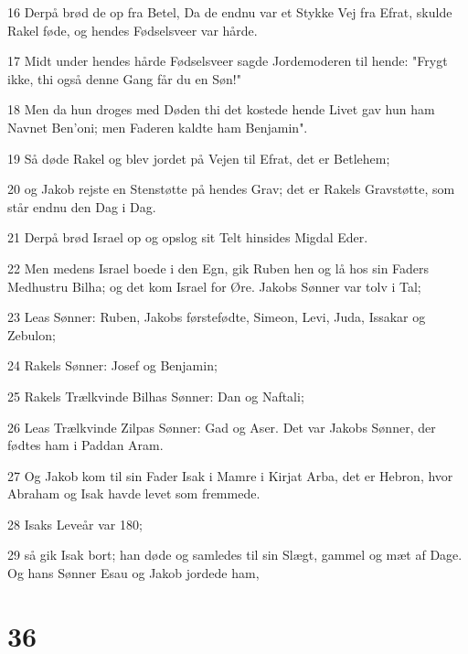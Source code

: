 \par 16 Derpå brød de op fra Betel, Da de endnu var et Stykke Vej fra Efrat, skulde Rakel føde, og hendes Fødselsveer var hårde.
\par 17 Midt under hendes hårde Fødselsveer sagde Jordemoderen til hende: "Frygt ikke, thi også denne Gang får du en Søn!"
\par 18 Men da hun droges med Døden thi det kostede hende Livet gav hun ham Navnet Ben'oni; men Faderen kaldte ham Benjamin".
\par 19 Så døde Rakel og blev jordet på Vejen til Efrat, det er Betlehem;
\par 20 og Jakob rejste en Stenstøtte på hendes Grav; det er Rakels Gravstøtte, som står endnu den Dag i Dag.
\par 21 Derpå brød Israel op og opslog sit Telt hinsides Migdal Eder.
\par 22 Men medens Israel boede i den Egn, gik Ruben hen og lå hos sin Faders Medhustru Bilha; og det kom Israel for Øre. Jakobs Sønner var tolv i Tal;
\par 23 Leas Sønner: Ruben, Jakobs førstefødte, Simeon, Levi, Juda, Issakar og Zebulon;
\par 24 Rakels Sønner: Josef og Benjamin;
\par 25 Rakels Trælkvinde Bilhas Sønner: Dan og Naftali;
\par 26 Leas Trælkvinde Zilpas Sønner: Gad og Aser. Det var Jakobs Sønner, der fødtes ham i Paddan Aram.
\par 27 Og Jakob kom til sin Fader Isak i Mamre i Kirjat Arba, det er Hebron, hvor Abraham og Isak havde levet som fremmede.
\par 28 Isaks Leveår var 180;
\par 29 så gik Isak bort; han døde og samledes til sin Slægt, gammel og mæt af Dage. Og hans Sønner Esau og Jakob jordede ham,

\chapter{36}


